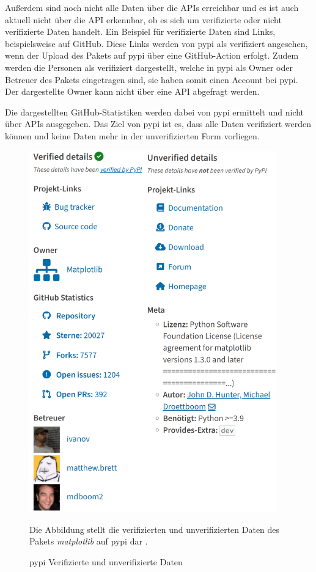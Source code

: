 Außerdem sind noch nicht alle Daten über die APIs erreichbar und es ist auch aktuell nicht über die API erkennbar, ob es sich um verifizierte oder nicht verifizierte Daten handelt.
Ein Beispiel für verifizierte Daten sind Links, beispielsweise auf GitHub.
Diese Links werden von \gls{pypi} als verifiziert angesehen, wenn der Upload des Pakets auf \gls{pypi} über eine GitHub-Action erfolgt.
Zudem werden die Personen als verifiziert dargestellt, welche in \gls{pypi} als Owner oder Betreuer des Pakets eingetragen sind, sie haben somit einen Account bei \gls{pypi}.
Der dargestellte Owner kann nicht über eine API abgefragt werden.

Die dargestellten GitHub-Statistiken werden dabei von \gls{pypi} ermittelt und nicht über APIs ausgegeben.
Das Ziel von \gls{pypi} ist es, dass alle Daten verifiziert werden können und keine Daten mehr in der unverifizierten Form vorliegen.

\begin{figure}
    \centering
    \includegraphics[width=0.95\textwidth]{bilder/pypi.png}
    \caption{\gls{pypi} Verifizierte und unverifizierte Daten}
    \label{fig:pypi_verified_unverified_details}
    \small
    \raggedright
    Die Abbildung stellt die verifizierten und unverifizierten Daten des Pakets \emph{matplotlib} auf \gls{pypi} dar \autocite{python_software_foundation_pypi_2024}.
\end{figure}

